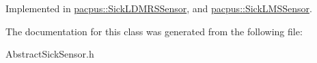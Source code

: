 Implemented in \hyperlink{classpacpus_1_1SickLDMRSSensor_a5b3674df80e98093692fac9643819ab5}{pacpus\-::\-Sick\-L\-D\-M\-R\-S\-Sensor}, and \hyperlink{classpacpus_1_1SickLMSSensor_a082417a753cef1d4f726c50b2e14a4d0}{pacpus\-::\-Sick\-L\-M\-S\-Sensor}.



The documentation for this class was generated from the following file\-:\begin{DoxyCompactItemize}
\item 
Abstract\-Sick\-Sensor.\-h\end{DoxyCompactItemize}
